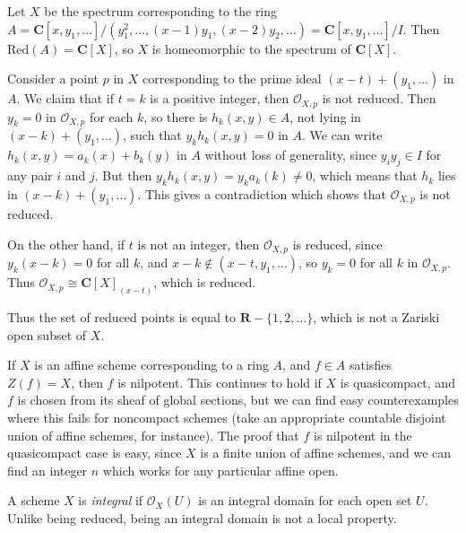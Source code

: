 \begin{example}
    Let $X$ be the spectrum corresponding to the ring $A = \mathbf{C}[x,y_1,\dots]/(y_1^2, \dots, (x-1)y_1, (x-2)y_2, \dots) = \mathbf{C}[x,y_1,\dots]/I$. Then $\text{Red}(A) = \mathbf{C}[X]$, so $X$ is homeomorphic to the spectrum of $\mathbf{C}[X]$.

    Consider a point $p$ in $X$ corresponding to the prime ideal $(x - t) + (y_1,\dots)$ in $A$. We claim that if $t = k$ is a positive integer, then $\mathcal{O}_{X,p}$ is not reduced. Then $y_k = 0$ in $\mathcal{O}_{X,p}$ for each $k$, so there is $h_k(x,y) \in A$, not lying in $(x - k) + (y_1,\dots)$, such that $y_kh_k(x,y) = 0$ in $A$. We can write $h_k(x,y) = a_k(x) + b_k(y)$ in $A$ without loss of generality, since $y_iy_j \in I$ for any pair $i$ and $j$. But then $y_kh_k(x,y) = y_k a_k(k) \neq 0$, which means that $h_k$ lies in $(x-k) + (y_1,\dots)$. This gives a contradiction which shows that $\mathcal{O}_{X,p}$ is not reduced.

    On the other hand, if $t$ is not an integer, then $\mathcal{O}_{X,p}$ is reduced, since $y_k(x-k) = 0$ for all $k$, and $x - k \not \in (x-t,y_1,\dots)$, so $y_k = 0$ for all $k$ in $\mathcal{O}_{X,p}$. Thus $\mathcal{O}_{X,p} \cong \mathbf{C}[X]_{(x-t)}$, which is reduced.

    Thus the set of reduced points is equal to $\mathbf{R} - \{ 1, 2, \dots \}$, which is not a Zariski open subset of $X$.
\end{example}

If $X$ is an affine scheme corresponding to a ring $A$, and $f \in A$ satisfies $Z(f) = X$, then $f$ is nilpotent. This continues to hold if $X$ is quasicompact, and $f$ is chosen from its sheaf of global sections, but we can find easy counterexamples where this fails for noncompact schemes (take an appropriate countable disjoint union of affine schemes, for instance). The proof that $f$ is nilpotent in the quasicompact case is easy, since $X$ is a finite union of affine schemes, and we can find an integer $n$ which works for any particular affine open.

A scheme $X$ is \emph{integral} if $\mathcal{O}_X(U)$ is an integral domain for each open set $U$. Unlike being reduced, being an integral domain is not a local property.

